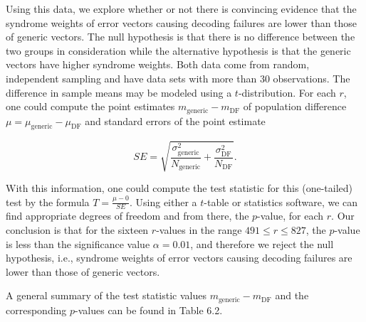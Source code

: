 Using this data, we explore whether or not there is convincing evidence that the syndrome weights of error vectors causing decoding failures are lower than those of generic vectors. The null hypothesis is that there is no difference between the two groups in consideration while the alternative hypothesis is that the generic vectors have higher syndrome weights. Both data come from random, independent sampling and have data sets with more than 30 observations. The difference in sample means may be modeled using a $t$-distribution. For each $r$, one could compute the point estimates $m_{\text{generic}} - m_{\text{DF}}$ of population difference $\mu = \mu_{\text{generic}} - \mu_{\text{DF}}$ and standard errors of the point estimate 

$$SE = \sqrt{\frac{\sigma_{\text{generic}}^2}{N_{\text{generic}} } +\frac{\sigma_{\text{DF}}^2}{N_{\text{DF}} } }.$$

With this information, one could compute the test statistic for this (one-tailed) test by the formula $T = \frac{\mu - 0}{SE}$. Using either a $t$-table or statistics software, we can find appropriate degrees of freedom and from there, the $p$-value, for each $r$. Our conclusion is that for the sixteen $r$-values in the range $491 \leq r \leq 827$, the $p$-value is less than the significance value $\alpha = 0.01$, and therefore we reject the null hypothesis, i.e., syndrome weights of error vectors causing decoding failures are lower than those of generic vectors.

A general summary of the test statistic values $m_{\text{generic}} - m_{\text{DF}}$ and the corresponding $p$-values can be found in Table 6.2.


